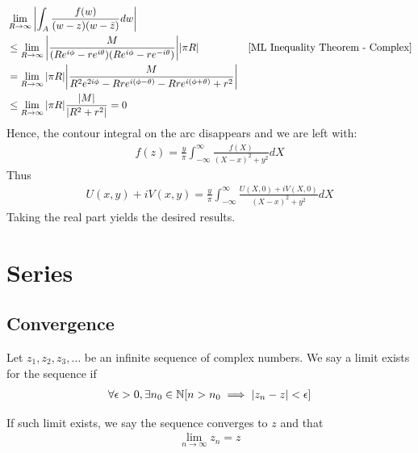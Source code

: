 \documentclass[12pt, english]{book}
\makeatletter
\renewenvironment{proof}[1][\proofname]{\par
	\pushQED{\qed}%
	\normalfont \topsep6\p@\@plus6\p@\relax
	\list{}{%
		\settowidth{\leftmargin}{\itshape\proofname:\hskip\labelsep}%
		\setlength{\labelwidth}{0pt}%
		\setlength{\itemindent}{-\leftmargin}%
		}%
	\item[\hskip\labelsep\itshape#1\@addpunct{:}]\ignorespaces
	}{\popQED\endlist\@endpefalse}
\makeatother
\begin{document}
\begin{proof}
{\begin{align*}
			&\lim_{R \rightarrow \infty}
			 \abs{\int_{A} \frac{f(w)}{(w-z)(w-\bar{z})} dw}  \\
			&\leq\lim_{R \rightarrow \infty} 
			 \abs{\frac{M}{(Re^{i\phi} - re^{i\theta})(Re^{i\phi} - re^{-i\theta})}} \abs{\pi R} & \Cref{ML Inequality Theorem - Complex} \\
			&= \lim_{R \rightarrow \infty} \abs{\pi R} 
			   \abs{\frac{M}{R^2 e^{2i\phi} - Rre^{i(\phi - \theta)} - Rre^{i(\phi + \theta)} + r^2}} \\
			&\leq \lim_{R \rightarrow \infty} \abs{\pi R} \frac{\abs{M}}{\abs{R^2 + r^2}}
			= 0 
		\end{align*}
		}
		Hence, the contour integral on the arc disappears and we are left with:
		\begin{align*}
			f(z)  = \frac{y}{\pi} \int_{-\infty}^{\infty} \frac{f(X)}{(X-x)^2 + y^2} dX
		\end{align*}
		Thus
		\begin{align*}
			U(x,y) + iV(x,y) = \frac{y}{\pi} \int_{-\infty}^{\infty} \frac{U(X, 0) + iV(X,0)}{(X-x)^2 + y^2} dX
		\end{align*}
		Taking the real part yields the desired results.
	\end{proof}

	\chapter{Series} \label{Series Chapter - Complex}
	
	\section{Convergence} \label{Convergence Section - Complex}
	
	\begin{definition}
		Let \(z_1, z_2, z_3, \ldots \) be an infinite sequence of complex numbers. We say a limit exists for the sequence if
		\begin{align*}
			\forall \epsilon > 0, \exists n_0 \in \mathbb{N}
			[n > n_0 \implies \abs{z_n - z} < \epsilon]
		\end{align*}
	\end{definition}
	
	\begin{definition}
		If such limit exists, we say the sequence converges to \(z\) and that 
		\begin{align*}
			\lim_{n \rightarrow \infty} z_n = z
		\end{align*}
	\end{definition}
	
\end{document}
